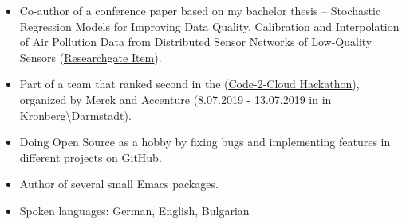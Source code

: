 \documentclass[letterpaper,10pt]{article}
\newcommand{\resumeSubHeadingListStart}{\begin{itemize}[leftmargin=*]}
\newcommand{\resumeSubHeadingListEnd}{\end{itemize}}
\begin{document}
\resumeSubHeadingListStart
\item Co-author of a conference paper based on my bachelor thesis -- Stochastic Regression Models for Improving Data Quality, Calibration and Interpolation of Air Pollution Data from Distributed Sensor Networks of Low-Quality Sensors (\href{https://www.researchgate.net/publication/331131928_Stochastische_Regressionsmodelle_zur_Verbesserung_der_Datenqualitat_Kalibrierung_und_Interpolation_von_Umwelt-und_Luftdaten_in_verteilten_Messnetzen_aus_Low-Cost_Sensoren}{\color{blue}\underline{Researchgate Item}}).
\item Part of a team that ranked second in the (\href{https://www.meetup.com/Darmstadt-InnovationM-Round-Table/events/262603767/}{\color{blue}\underline{Code-2-Cloud Hackathon}}), organized by Merck and Accenture (8.07.2019 - 13.07.2019 in in Kronberg\textbackslash Darmstadt).
\item Doing Open Source as a hobby by fixing bugs and implementing features in different projects on GitHub.
\item Author of several small Emacs packages.
\item Spoken languages: German, English, Bulgarian
\resumeSubHeadingListEnd
  
\end{document}

